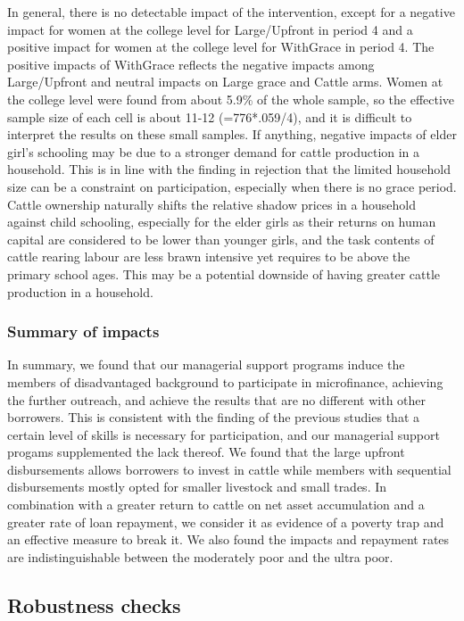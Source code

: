 	In general, there is no detectable impact of the intervention, except for a negative impact for women at the college level for \textsf{Large/Upfront} in period 4 and a positive impact for women at the college level for \textsf{WithGrace} in period 4. The positive impacts of \textsf{WithGrace} reflects the negative impacts among \textsf{Large/Upfront} and neutral impacts on \textsf{Large grace} and \textsf{Cattle} arms. Women at the college level were found from about 5.9\% of the whole sample, so the effective sample size of each cell is about 11-12 (=776*.059/4), and it is difficult to interpret the results on these small samples. If anything, negative impacts of elder girl's schooling may be due to a stronger demand for cattle production in a household. This is in line with the finding in rejection that the limited household size can be a constraint on participation, especially when there is no grace period. Cattle ownership naturally shifts the relative shadow prices in a household against child schooling, especially for the elder girls as their returns on human capital are considered to be lower than younger girls, and the task contents of cattle rearing labour are less brawn intensive yet requires to be above the primary school ages. This may be a potential downside of having greater cattle production in a household. 

\subsubsection{Summary of impacts}

	In summary, we found that our managerial support programs induce the members of disadvantaged background to participate in microfinance, achieving the further outreach, and achieve the results that are no different with other borrowers. This is consistent with the finding of the previous studies that a certain level of skills is necessary for participation, and our managerial support progams supplemented the lack thereof. We found that the large upfront disbursements allows borrowers to invest in cattle while members with sequential disbursements mostly opted for smaller livestock and small trades. In combination with a greater return to cattle on net asset accumulation and a greater rate of loan repayment, we consider it as evidence of a poverty trap and an effective measure to break it. We also found the impacts and repayment rates are indistinguishable between the moderately poor and the ultra poor.


\subsection{Robustness checks}
\label{subsec RobustnessCheck}


